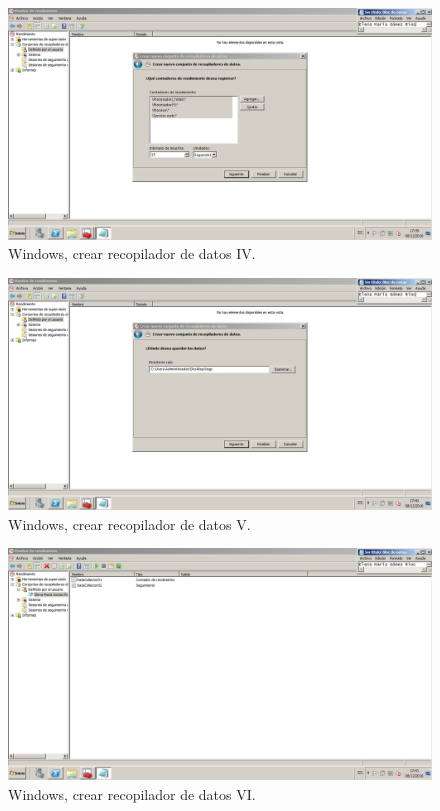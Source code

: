 \begin{figure}[H] 
	\centering
	\includegraphics[width=14.7cm]{./img/ejercicio5_4.png} 	
	\caption{Windows, crear recopilador de datos IV.} \label{fig:ejercicio5_4}
\end{figure}

\begin{figure}[H] 
	\centering
	\includegraphics[width=14.7cm]{./img/ejercicio5_5.png} 	
	\caption{Windows, crear recopilador de datos V.} \label{fig:ejercicio5_5}
\end{figure}

\begin{figure}[H] 
	\centering
	\includegraphics[width=14.7cm]{./img/ejercicio5_6.png} 	
	\caption{Windows, crear recopilador de datos VI.} \label{fig:ejercicio5_6}
\end{figure}


